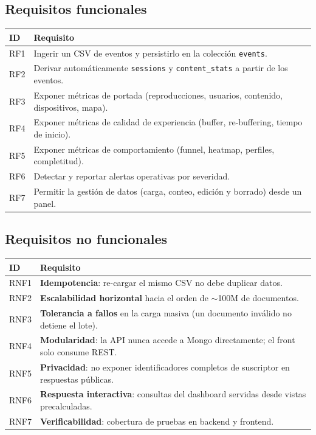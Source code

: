 \documentclass[12pt, letterpaper]{article}
\newcommand{\code}[1]{\texttt{#1}}
\begin{document}
\subsection{Requisitos funcionales}
\begin{center}
\begin{tabular}{@{}lL{10cm}@{}}
\toprule
\textbf{ID} & \textbf{Requisito} \\
\midrule
RF1 & Ingerir un CSV de eventos y persistirlo en la colección \code{events}. \\
RF2 & Derivar automáticamente \code{sessions} y \code{content\_stats} a partir de los eventos. \\
RF3 & Exponer métricas de portada (reproducciones, usuarios, contenido, dispositivos, mapa). \\
RF4 & Exponer métricas de calidad de experiencia (buffer, re-buffering, tiempo de inicio). \\
RF5 & Exponer métricas de comportamiento (funnel, heatmap, perfiles, completitud). \\
RF6 & Detectar y reportar alertas operativas por severidad. \\
RF7 & Permitir la gestión de datos (carga, conteo, edición y borrado) desde un panel. \\
\bottomrule
\end{tabular}
\end{center}

\subsection{Requisitos no funcionales}
\begin{center}
\begin{tabular}{@{}lL{10cm}@{}}
\toprule
\textbf{ID} & \textbf{Requisito} \\
\midrule
RNF1 & \textbf{Idempotencia}: re-cargar el mismo CSV no debe duplicar datos. \\
RNF2 & \textbf{Escalabilidad horizontal} hacia el orden de $\sim$100M de documentos. \\
RNF3 & \textbf{Tolerancia a fallos} en la carga masiva (un documento inválido no detiene el lote). \\
RNF4 & \textbf{Modularidad}: la API nunca accede a Mongo directamente; el front solo consume REST. \\
RNF5 & \textbf{Privacidad}: no exponer identificadores completos de suscriptor en respuestas públicas. \\
RNF6 & \textbf{Respuesta interactiva}: consultas del dashboard servidas desde vistas precalculadas. \\
RNF7 & \textbf{Verificabilidad}: cobertura de pruebas en backend y frontend. \\
\bottomrule
\end{tabular}
\end{center}
\end{document}
